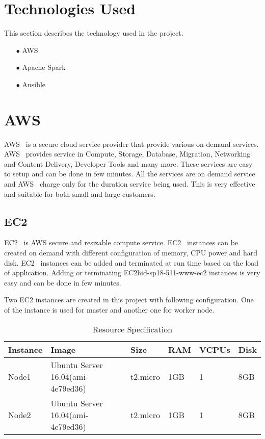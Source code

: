 \section{Technologies Used}
This section describes the technology used in the project.

\begin{itemize}
	\item[$\bullet$] AWS \item[$\bullet$] Apache
	Spark \item[$\bullet$] Ansible
\end{itemize}

\section{AWS}

AWS~\cite{hid-sp18-511-www-aws} is a secure cloud service provider
that provide various on-demand services.
AWS~\cite{hid-sp18-511-www-aws} provides service in Compute, Storage,
Database, Migration, Networking and Content Delivery, Developer Tools
and many more. These services are easy to setup and can be done in few
minutes. All the services are on demand service and
AWS~\cite{hid-sp18-511-www-aws} charge only for the duration service
being used. This is very effective and suitable for both small and
large customers.

\subsection{EC2}

EC2~\cite{hid-sp18-511-www-ec2} is AWS secure and resizable compute
service. EC2~\cite{hid-sp18-511-www-ec2} instances can be created on
demand with different configuration of memory, CPU power and hard
disk. EC2~\cite{hid-sp18-511-www-ec2} instances can be added and
terminated at run time based on the load of application. Adding or
terminating EC2{hid-sp18-511-www-ec2} instances is very easy and can
be done in few minutes.

Two EC2 instances are created in this project with following
configuration. One of the instance is used for master and another one
for worker node.

\begin{table}[]
	\centering \caption{Resource
	Specification} \label{t:resource-specification} \begin{tabular}{|l|l|l|l|l|l|} \hline \textbf{Instance}
	& \textbf{Image} & \textbf{Size} & \textbf{RAM}
	& \textbf{VCPUs} & \textbf{Disk} \\ \hline Node1 & Ubuntu
	Server 16.04(ami-4e79ed36) & t2.micro & 1GB & 1 &
	8GB \\ \hline Node2 & Ubuntu Server 16.04(ami-4e79ed36) &
	t2.micro & 1GB & 1 & 8GB \\ \hline \end{tabular}
\end{table}


